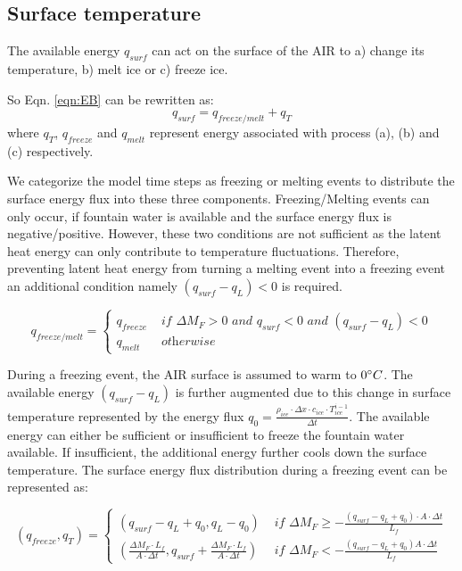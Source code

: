 \documentclass[utf8]{frontiersSCNS} %
\begin{document}
\subsection{Surface temperature}

The available energy $q_{surf}$ can act on the surface of the AIR to a) change its temperature, b) melt ice or c) freeze
ice.

So Eqn. \ref{eqn:EB} can be rewritten as: \begin{equation} q_{surf} = q_{freeze/melt} + q_{T} \end{equation} where
$q_{T}$, $q_{freeze}$ and $q_{melt}$ represent energy associated with process (a), (b) and (c) respectively.

We categorize the model time steps as freezing or melting events to distribute the surface energy flux into these three
components. Freezing/Melting events can only occur, if fountain water is available and the surface energy flux is
negative/positive. However, these two conditions are not sufficient as the latent heat energy can only contribute to
temperature fluctuations. Therefore, preventing latent heat energy from turning a melting event into a freezing event an
additional condition namely $(q_{surf}-q_{L}) < 0$ is required.

\begin{equation}
	q_{freeze/melt} = \left\{ \begin{array}{ll}
		q_{freeze} & \textit{ if } \Delta M_{F} > 0 \textit{ and } q_{surf} < 0 \textit{ and }(q_{surf}-q_{L}) < 0 \\
		q_{melt}   & \textit{ otherwise}
	\end{array} \right.
\end{equation}

During a freezing event, the AIR surface is assumed to warm to $0 \degree C$. The available energy $(q_{surf}-q_{L})$ is
further augmented due to this change in surface temperature represented by the energy flux $q_{0} = \frac{\rho_{ice}
		\cdot \Delta x \cdot c_{ice} \cdot T_{ice}^{i-1}}{\Delta t}$. The available energy can either be sufficient or
insufficient to freeze the fountain water available. If insufficient, the additional energy further cools down the
surface temperature. The surface energy flux distribution during a freezing event can be represented as:

\begin{equation}
	(q_{freeze}, q_{T}) = \left\{ \begin{array}{ll}
		(q_{surf}-q_{L}+q_{0}, q_{L}-q_{0}) & \textit{ if } \Delta M_{F} \geq -\frac{(q_{surf}-q_{L}+q_{0}) \cdot A \cdot \Delta
		t}{L_f}                                                                                                                  \\
		(\frac{\Delta M_{F} \cdot L_f
		}{A \cdot \Delta t}
		, q_{surf}+\frac{\Delta M_{F} \cdot L_f
		}{A \cdot \Delta t})                & \textit{ if } \Delta M_{F} < -\frac{(q_{surf}-q_{L}+q_0) A \cdot \Delta
		t}{L_f}
	\end{array} \right.
\end{equation}
\end{document}
